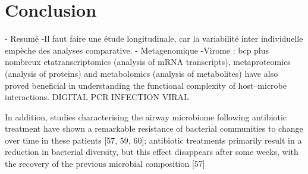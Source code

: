 \documentclass[12pt,a4paper]{article}
\begin{document}
\section{Conclusion}
- Resumé 
-Il faut faire une étude longitudinale, car la variabilité inter individuelle empèche des analyses comparative. 
- Metagenomique 
-Virome  : bcp plus nombreux 
etatranscriptomics (analysis of mRNA transcripts), metaproteomics (analysis of proteins) and metabolomics (analysis of metabolites) have also proved beneficial in understanding the functional complexity of host–microbe interactions.
DIGITAL PCR
INFECTION VIRAL

In addition, studies characterising the airway microbiome following antibiotic treatment have shown a
remarkable resistance of bacterial communities to change over time in these patients [57, 59, 60];
antibiotic treatments primarily result in a reduction in bacterial diversity, but this effect disappears after
some weeks, with the recovery of the previous microbial composition [57]

\newpage




\end{document}
